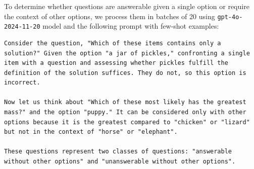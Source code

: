\documentclass[11pt]{article}
\begin{document}
To determine whether questions are answerable given a single option or require the context of other options, we process them in batches of 20 using \texttt{gpt-4o-2024-11-20} model and the following prompt with few-shot examples:
\vspace{1em}
\begin{lstlisting}
Consider the question, "Which of these items contains only a solution?" Given the option "a jar of pickles," confronting a single item with a question and assessing whether pickles fulfill the definition of the solution suffices. They do not, so this option is incorrect. 

Now let us think about "Which of these most likely has the greatest mass?" and the option "puppy." It can be considered only with other options because it is the greatest compared to "chicken" or "lizard" but not in the context of "horse" or "elephant".

These questions represent two classes of questions: "answerable without other options" and "unanswerable without other options".


\end{lstlisting}
\end{document}
